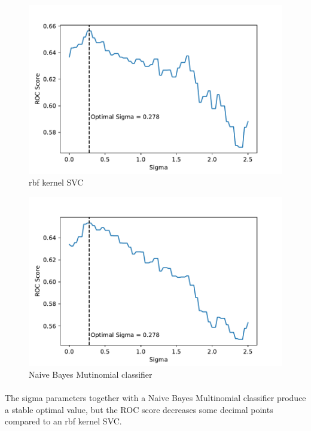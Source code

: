 \documentclass[12pt,a4paper]{report}
\begin{document}
\begin{figure}[b]
        \includegraphics[width=\textwidth]{imgs/180531_Sigma_fixed_test_08.pdf}
        \caption{rbf kernel SVC}
        \label{fig:OptimalSigmaFixedTestSVC}
\end{figure}

\begin{figure}[b]
        \includegraphics[width=\textwidth]{imgs/180601_ROC_NBayes_00.pdf}
        \caption{Naive Bayes Mutinomial classifier}
        \label{fig:OptimalSigmaFixedTestNB}
\end{figure}

\paragraph{} The sigma parameters together with a Naive Bayes Multinomial classifier produce a stable optimal value, but the ROC score decreases some decimal points compared to an rbf kernel SVC.
\end{document}
